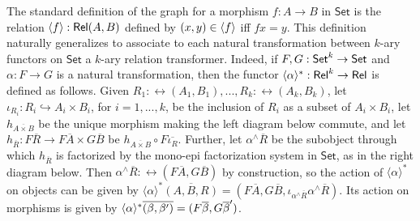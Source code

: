 \documentclass[runningheads]{llncs}
\newcommand{\set}{\mathsf{Set}}
\begin{document}
The standard definition of the graph for a morphism $f : A \to B$ in
$\set$ is the relation $\langle {f} \rangle : \mathsf{Rel}(A,B)$ defined by $(x,y) \in
\langle {f} \rangle$ iff $fx = y$. This definition naturally generalizes to
associate to each natural transformation between $k$-ary functors on
$\set$ a $k$-ary relation transformer. Indeed,
if $F, G: \mathsf{Set}^k \to \mathsf{Set}$
and $\alpha : F \to G$ is a natural transformation, then the functor
$\langle {\alpha} \rangle^*: \mathsf{Rel}^k \to \mathsf{Rel}$ is defined as follows. Given $R_1
: \rel(A_1, B_1),...,R_k : \rel(A_k,B_k)$, let $\iota_{R_i} : R_i
\hookrightarrow A_i \times B_i$, for $i = 1,...,k$, be the inclusion
of $R_i$ as a subset of $A_i \times B_i$,
let $h_{\overline{A \times B}}$ be the unique morphism making the left
diagram below commute, and let $h_{\overline{R}} : F\overline{R} \to
F\overline{A} \times G\overline{B}$ be $h_{\overline{A \times B}}
\circ F\overline{\iota_R}$.  Further, let $\alpha^\wedge\overline{R}$
be the subobject through which $h_{\overline{R}}$ is factorized by the
mono-epi factorization system in $\set$, as in the right diagram
below. Then $\alpha^\wedge\overline{R} : \rel(F\overline{A},
G\overline{B})$ by construction, so the action of $\langle \alpha
\rangle^*$ on objects can be given by $\langle \alpha \rangle^*
\overline{(A,B,R)} = (F\overline{A}, G\overline{B},
\iota_{\alpha^\wedge \overline{R}}\alpha^\wedge\overline{R})$. Its
action on morphisms is given by $\langle {\alpha} \rangle^*\overline{(\beta,
  \beta')} = (F\overline\beta, G\overline\beta')$.
\end{document}
